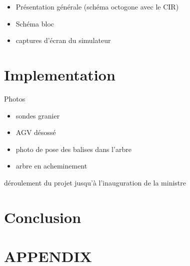 \documentclass[letterpaper, 10 pt, conference]{IEEEtran}  %
\begin{document}
\begin{itemize}
    \item Présentation générale (schéma octogone avec le CIR)
    \item Schéma bloc
    \item captures d’écran du simulateur
\end{itemize}


\section{Implementation}

Photos

\begin{itemize}
    \item sondes granier
    \item AGV désossé
    \item photo de pose des balises dans l’arbre
    \item arbre en acheminement
\end{itemize}


déroulement du projet
jusqu’à l’inauguration de la ministre




\section{Conclusion}


\addtolength{\textheight}{-12cm}   %
\section*{APPENDIX}
\end{document}
